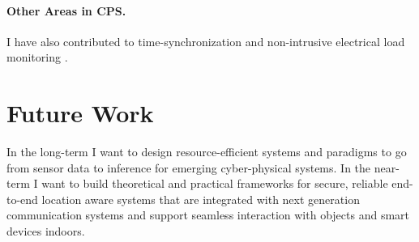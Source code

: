 \documentclass[10pt]{article}
\begin{document}

\paragraph{Other Areas in CPS. }
I have also contributed to time-synchronization \cite{buevich2013hardware, dongare2017pulsar} and non-intrusive electrical load
monitoring \cite{rajagopal2013magnetic, rajagopal2013demo}.

\section{Future Work}
In the long-term I want to design resource-efficient systems and paradigms to go from sensor data to inference for emerging cyber-physical systems.
In the near-term I want to build theoretical and practical frameworks for secure, reliable end-to-end location aware systems that are integrated with next generation communication systems and support seamless interaction with objects and smart devices indoors. 
\end{document}
